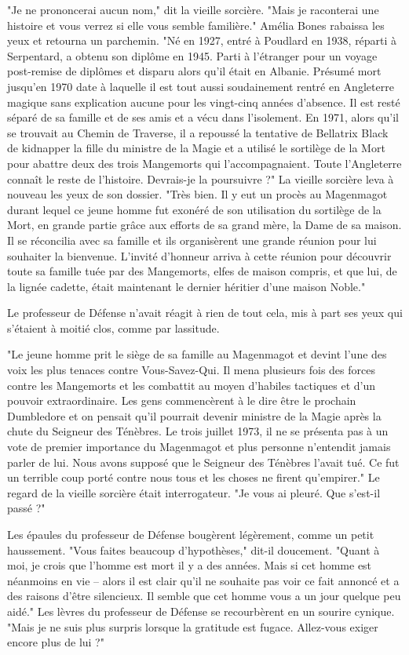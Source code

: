 "Je ne prononcerai aucun nom," dit la vieille sorcière. "Mais je raconterai une histoire et vous verrez si elle vous semble familière." Amélia Bones rabaissa les yeux et retourna un parchemin. "Né en 1927, entré à Poudlard en 1938, réparti à Serpentard, a obtenu son diplôme en 1945. Parti à l'étranger pour un voyage post-remise de diplômes et disparu alors qu'il était en Albanie. Présumé mort jusqu'en 1970 date à laquelle il est tout aussi soudainement rentré en Angleterre magique sans explication aucune pour les vingt-cinq années d'absence. Il est resté séparé de sa famille et de ses amis et a vécu dans l'isolement. En 1971, alors qu'il se trouvait au Chemin de Traverse, il a repoussé la tentative de Bellatrix Black de kidnapper la fille du ministre de la Magie et a utilisé le sortilège de la Mort pour abattre deux des trois Mangemorts qui l'accompagnaient. Toute l'Angleterre connaît le reste de l'histoire. Devrais-je la poursuivre ?" La vieille sorcière leva à nouveau les yeux de son dossier. "Très bien. Il y eut un procès au Magenmagot durant lequel ce jeune homme fut exonéré de son utilisation du sortilège de la Mort, en grande partie grâce aux efforts de sa grand mère, la Dame de sa maison. Il se réconcilia avec sa famille et ils organisèrent une grande réunion pour lui souhaiter la bienvenue. L'invité d'honneur arriva à cette réunion pour découvrir toute sa famille tuée par des Mangemorts, elfes de maison compris, et que lui, de la lignée cadette, était maintenant le dernier héritier d'une maison Noble."

Le professeur de Défense n'avait réagit à rien de tout cela, mis à part ses yeux qui s'étaient à moitié clos, comme par lassitude.

"Le jeune homme prit le siège de sa famille au Magenmagot et devint l'une des voix les plus tenaces contre Vous-Savez-Qui. Il mena plusieurs fois des forces contre les Mangemorts et les combattit au moyen d'habiles tactiques et d'un pouvoir extraordinaire. Les gens commencèrent à le dire être le prochain Dumbledore et on pensait qu'il pourrait devenir ministre de la Magie après la chute du Seigneur des Ténèbres. Le trois juillet 1973, il ne se présenta pas à un vote de premier importance du Magenmagot et plus personne n'entendit jamais parler de lui. Nous avons supposé que le Seigneur des Ténèbres l'avait tué. Ce fut un terrible coup porté contre nous tous et les choses ne firent qu'empirer." Le regard de la vieille sorcière était interrogateur. "Je vous ai pleuré. Que s'est-il passé ?"

Les épaules du professeur de Défense bougèrent légèrement, comme un petit haussement. "Vous faites beaucoup d'hypothèses," dit-il doucement. "Quant à moi, je crois que l'homme est mort il y a des années. Mais si cet homme est néanmoins en vie – alors il est clair qu'il ne souhaite pas voir ce fait annoncé et a des raisons d'être silencieux. Il semble que cet homme vous a un jour quelque peu aidé." Les lèvres du professeur de Défense se recourbèrent en un sourire cynique. "Mais je ne suis plus surpris lorsque la gratitude est fugace. Allez-vous exiger encore plus de lui ?"

